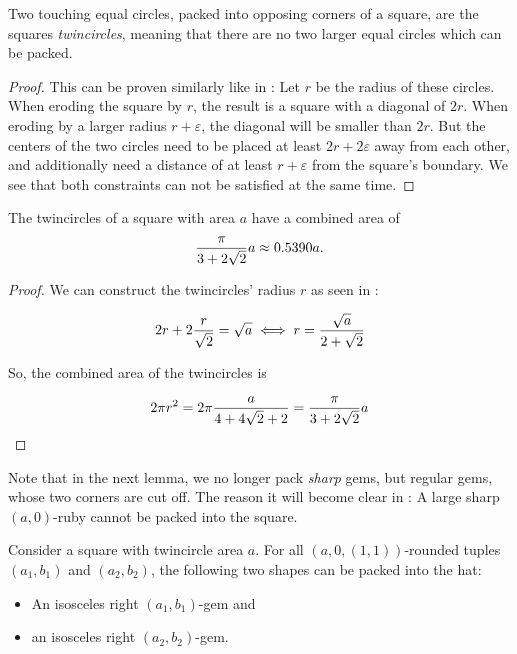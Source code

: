 \documentclass[a4paper,style=print,oneside,bibliography=totoc,nexus,lnum,extramargin]{tubsbook}
\begin{document}
\begin{lemma}\label{th:square-worst}
    Two touching equal circles, packed into opposing corners of a square, are the squares \emph{twincircles}, meaning that there are no two larger equal circles which can be packed.
\end{lemma}

\begin{proof}
    This can be proven similarly like in : Let $r$ be the radius of these circles. When eroding the square by $r$, the result is a square with a diagonal of $2r$. When eroding by a larger radius $r + \varepsilon$, the diagonal will be smaller than $2r$. But the centers of the two circles need to be placed at least $2r + 2\varepsilon$ away from each other, and additionally need a distance of at least $r + \varepsilon$ from the square's boundary. We see that both constraints can not be satisfied at the same time.
\end{proof}

\begin{lemma}\label{th:square-twincircle-area}
    The twincircles of a square with area $a$
    have a combined area of
    $$\frac{\pi}{3+2\sqrt{2}}a \approx 0.5390a.$$
\end{lemma}

\begin{proof}
    We can construct the twincircles' radius $r$ as seen in :

    \begin{equation*}
        2r + 2\frac{r}{\sqrt{2}} = \sqrt{a} \iff r = \frac{\sqrt{a}}{2 + \sqrt{2}}
    \end{equation*}

    So, the combined area of the twincircles is

    $$2\pi r^2 = 2\pi\frac{a}{4 + 4\sqrt{2} + 2} = \frac{\pi}{3+2\sqrt{2}}a$$
\end{proof}


Note that in the next lemma, we no longer pack \emph{sharp} gems, but regular gems, whose two corners are cut off. The reason it will become clear in : A large sharp $(a,0)$-ruby cannot be packed into the square.

\begin{lemma}\label{th:gems-in-square}
    Consider a square with twincircle area $a$.
    For all $(a,0,(1,1))$-rounded tuples $(a_1, b_1)$ and $(a_2, b_2)$, the following two shapes can be packed into the hat:
    \begin{itemize}
        \item An isosceles right $(a_1,b_1)$-gem and
        \item an isosceles right $(a_2,b_2)$-gem.
    \end{itemize}
\end{lemma}
\end{document}
